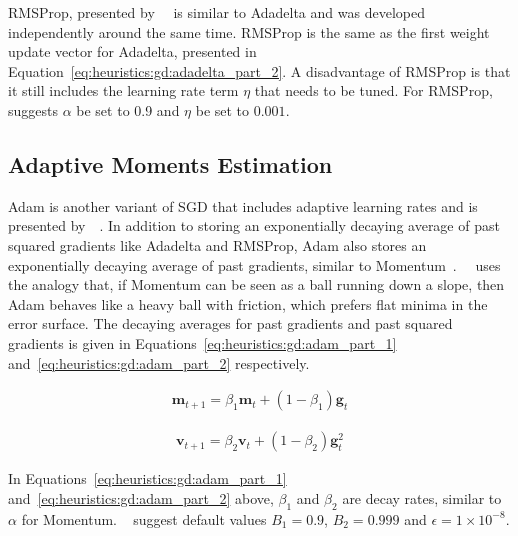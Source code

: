 \Acf{RMSProp}, presented by~\citeauthor{ref:hinton:2012}~\cite{ref:hinton:2012} is similar to \acs{Adadelta}  and was developed independently around the same time. \acs{RMSProp} is the same as the first weight update vector for \acs{Adadelta}, presented in Equation~\eqref{eq:heuristics:gd:adadelta_part_2}. A disadvantage of \acs{RMSProp} is that it still includes the learning rate term $\eta$ that needs to be tuned. For \acs{RMSProp},~\citeauthor{ref:hinton:2012}~\cite{ref:hinton:2012} suggests $\alpha$ be set to 0.9 and $\eta$ be set to $0.001$.


\subsection{Adaptive Moments Estimation}\label{sec:heuristics:adam}

\Acf{Adam} is another variant of \acs{SGD} that includes adaptive learning rates and is presented by~\citeauthor{ref:kingma:2014}~\cite{ref:kingma:2014}. In addition to storing an exponentially decaying average of past squared gradients like \acs{Adadelta} and \acs{RMSProp}, \acs{Adam} also stores an exponentially decaying average of past gradients, similar to \acs{Momentum}~\cite{ref:ruder:2016}.~\citeauthor{ref:heusel:2017}~\cite{ref:heusel:2017} uses the analogy that, if \acs{Momentum} can be seen as a ball running down a slope, then \acs{Adam} behaves like a heavy ball with friction, which prefers flat minima in the error surface. The decaying averages for past gradients and past squared gradients is given in Equations~\eqref{eq:heuristics:gd:adam_part_1} and~\eqref{eq:heuristics:gd:adam_part_2} respectively.

\begin{equation}
      \label{eq:heuristics:gd:adam_part_1}
      \begin{split}
            \boldsymbol{m}_{t+1} = \beta_{1}\boldsymbol{m}_{t} + (1 - \beta_{1})\boldsymbol{g}_{t}
      \end{split}
\end{equation}

\begin{equation}
      \label{eq:heuristics:gd:adam_part_2}
      \begin{split}
            \boldsymbol{v}_{t+1} = \beta_{2}\boldsymbol{v}_{t} + (1 - \beta_{2})\boldsymbol{g}^{2}_{t}
      \end{split}
\end{equation}

In Equations~\eqref{eq:heuristics:gd:adam_part_1} and~\eqref{eq:heuristics:gd:adam_part_2} above, $\beta_{1}$ and $\beta_{2}$ are decay rates, similar to $\alpha$ for \acs{Momentum}. \citeauthor{ref:kingma:2014}~\cite{ref:kingma:2014} suggest default values $B_{1}=0.9$, $B_{2}=0.999$ and $\epsilon = 1 \times 10^{-8}$.

